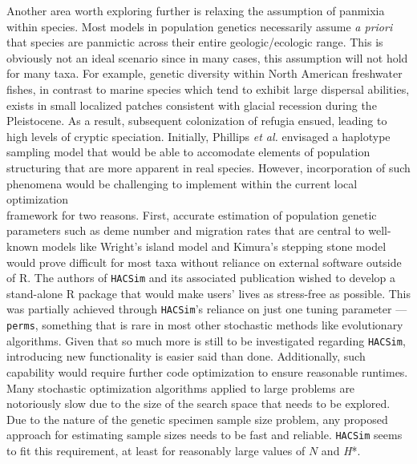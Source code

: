 Another area worth exploring further is relaxing the assumption of panmixia within species. Most models in population genetics necessarily assume \textit{a priori} that species are panmictic across their entire geologic/ecologic range. This is obviously not an ideal scenario since in many cases, this assumption will not hold for many taxa. For example, genetic diversity within North American freshwater fishes, in contrast to marine species which tend to exhibit large dispersal abilities, exists in small localized patches consistent with glacial recession during the Pleistocene. As a result, subsequent colonization of refugia ensued, leading to high levels of cryptic speciation. Initially, Phillips \textit{et al.} \cite{phillips2019incomplete} envisaged a haplotype sampling model that would be able to accomodate elements of population structuring that are more apparent in real species. However, incorporation of such phenomena would be challenging to implement within the current local optimization \\ framework for two reasons. First, accurate estimation of population genetic parameters such as deme number and migration rates that are central to well-known models like Wright's island model \cite{wright1951genetical} and Kimura's stepping stone model \cite{kimura1964stepping} would prove difficult for most taxa without reliance on external software outside of R. The authors of {\tt HACSim} and its associated publication \cite{phillips2020hacsim} wished to develop a stand-alone R package that would make users' lives as stress-free as possible. This was partially achieved through {\tt HACSim}'s reliance on just one tuning parameter --- {\tt perms}, something that is rare in most other stochastic methods like evolutionary algorithms. Given that so much more is still to be investigated regarding {\tt HACSim}, introducing new functionality is easier said than done. Additionally, such capability would require further code optimization to ensure reasonable runtimes. Many stochastic optimization algorithms applied to large problems are \\ notoriously slow due to the size of the search space that needs to be explored. Due to the nature of the genetic specimen sample size problem, any proposed approach for estimating sample sizes needs to be fast and reliable. {\tt HACSim} seems to fit this requirement, at least for reasonably large values of $N$ and \textit{H}*.



